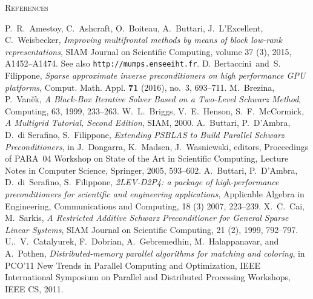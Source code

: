 \begin{thebibliography}{99}
\ifpdf
{}
\fi
{}
         {\textsc{References}}

%
P.~R.~Amestoy, C.~Ashcraft, O.~Boiteau, A.~Buttari, J.~L'Excellent, C.~Weisbecker,
{\em Improving multifrontal methods by means of block low-rank representations},
SIAM Journal on Scientific Computing, volume 37 (3), 2015, A1452--A1474.
See also {\tt http://mumps.enseeiht.fr}.
%
D. Bertaccini\ and\ S. Filippone, 
{\em Sparse approximate inverse preconditioners on high performance GPU platforms}, 
Comput. Math. Appl. {\bf 71} (2016), no.~3, 693--711.
%
M.~Brezina, P.~Van\v{e}k,
{\em A Black-Box Iterative Solver Based on a Two-Level Schwarz Method},
Computing, 63, 1999, 233--263.
%
W.~L.~Briggs, V.~E.~Henson, S.~F.~McCormick,
{\em A Multigrid Tutorial, Second Edition},
SIAM, 2000.
%
A.~Buttari, P.~D'Ambra, D.~di Serafino, S.~Filippone,
{\em Extending PSBLAS to Build Parallel Schwarz Preconditioners},
in J.~Dongarra, K.~Madsen, J.~Wasniewski, editors,
Proceedings of PARA~04 Workshop on State of the Art
in Scientific Computing, Lecture Notes in Computer Science,
Springer, 2005, 593--602.
%
A.~Buttari, P.~D'Ambra, D.~di~Serafino, S.~Filippone,
{\em 2LEV-D2P4: a package of high-performance preconditioners
for scientific and engineering applications},
Applicable Algebra in Engineering, Communications and Computing,
18 (3) 2007, 223--239.
%
%
X.~C.~Cai, M.~Sarkis,
{\em A Restricted Additive Schwarz Preconditioner for General Sparse Linear Systems},
SIAM Journal on Scientific Computing, 21 (2), 1999, 792--797.
%
U..~V.~Catalyurek, F.~Dobrian, A.~Gebremedhin, M.~Halappanavar, and A.~Pothen,
{\em Distributed-memory parallel algorithms for matching and coloring}, in PCO’11 New Trends
in Parallel Computing and Optimization, IEEE International Symposium on Parallel and
Distributed Processing Workshops, IEEE CS, 2011.
%

\end{thebibliography}
